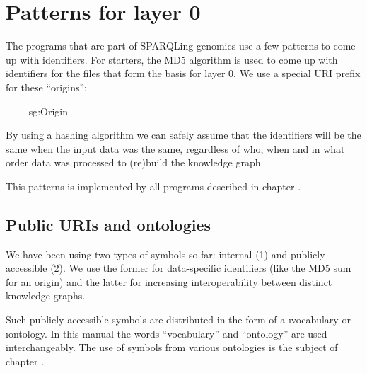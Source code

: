 \section{Patterns for layer 0}

  The programs that are part of SPARQLing genomics use a few patterns to
  come up with identifiers.  For starters, the MD5 algorithm is used to come
  up with identifiers for the files that form the basis for layer 0.  We use
  a special URI prefix for these ``origins'':

  \ \ \ \ 
  {sg:Origin}

  By using a hashing algorithm we can safely assume that the identifiers will
  be the same when the input data was the same, regardless of who, when and
  in what order data was processed to (re)build the knowledge graph.

  This patterns is implemented by all programs described in chapter
  .

\subsection{Public URIs and ontologies}
\label{sec:public-uris-and-ontologies}
  We have been using two types of symbols so far: internal (1) and publicly
  accessible (2).  We use the former for data-specific identifiers (like the
  MD5 sum for an origin) and the latter for increasing interoperability between
  distinct knowledge graphs.

  Such publicly accessible symbols are distributed in the form of a
  \i{vocabulary} or \i{ontology}.  In this manual the words ``vocabulary''
  and ``ontology'' are used interchangeably.  The use of symbols from various
  ontologies is the subject of chapter .
